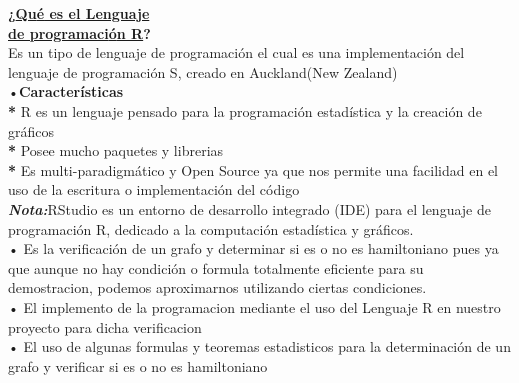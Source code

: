 \documentclass[journal]{IEEEtran}
\begin{document}
\textbf{¿\underline{Qu{\'e} es el Lenguaje}}\\
\textbf{\underline{de programaci{\'o}n R}?}\\
Es un tipo de lenguaje de programaci{\'o}n el cual es una implementaci{\'o}n del lenguaje de programaci{\'o}n S, creado en Auckland(New Zealand)\\
•\textbf{Caracter{\'i}sticas}\\
\textbf{*} R es un lenguaje pensado para la programaci{\'o}n estad{\'i}stica y la creaci{\'o}n de gr{\'a}ficos\\
\textbf{*} Posee mucho paquetes y librerias\\
\textbf{*} Es multi-paradigm{\'a}tico y Open Source ya que nos permite una facilidad en el uso de la escritura o implementaci{\'o}n del c{\'o}digo\\
\textit{\textbf{Nota:}}RStudio es un entorno de desarrollo integrado (IDE) para el lenguaje de programación R, dedicado a la computación estadística y gráficos.\\

• Es la verificaci{\'o}n de un grafo y determinar si es o no es hamiltoniano  pues ya que aunque no hay condici{\'o}n o formula totalmente eficiente para su demostracion, podemos aproximarnos utilizando ciertas condiciones.\\
• El implemento de la programacion mediante el uso del Lenguaje R en nuestro proyecto para dicha verificacion\\
• El uso de algunas formulas y teoremas estadisticos para la determinaci{\'o}n de un grafo y verificar si es o no es hamiltoniano\\[5cm]
\end{document}

